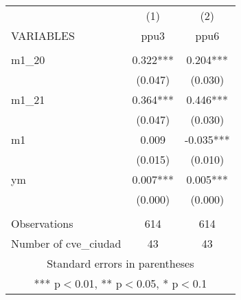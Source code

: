 \begin{tabular}{lcc} \hline
 & (1) & (2) \\
VARIABLES & ppu3 & ppu6 \\ \hline
 &  &  \\
m1\_20 & 0.322*** & 0.204*** \\
 & (0.047) & (0.030) \\
m1\_21 & 0.364*** & 0.446*** \\
 & (0.047) & (0.030) \\
m1 & 0.009 & -0.035*** \\
 & (0.015) & (0.010) \\
ym & 0.007*** & 0.005*** \\
 & (0.000) & (0.000) \\
 &  &  \\
Observations & 614 & 614 \\
 Number of cve\_ciudad & 43 & 43 \\ \hline
\multicolumn{3}{c}{ Standard errors in parentheses} \\
\multicolumn{3}{c}{ *** p$<$0.01, ** p$<$0.05, * p$<$0.1} \\
\end{tabular}
